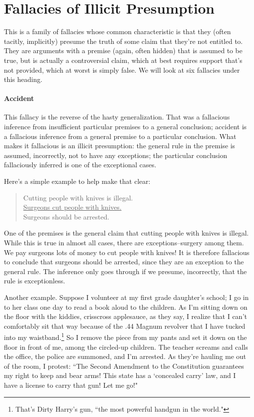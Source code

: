 \chapter{Fallacies of Illicit Presumption}
This is a family of fallacies whose common characteristic is that they (often tacitly, implicitly)
presume the truth of some claim that they're not entitled to. They are arguments with a premise
(again, often hidden) that is assumed to be true, but is actually a controversial claim, which at best
requires support that's not provided, which at worst is simply false. We will look at six fallacies
under this heading.

\subsubsection{Accident}
This fallacy is the reverse of the hasty generalization. That was a fallacious inference from
insufficient particular premises to a general conclusion; accident is a fallacious inference from a
general premise to a particular conclusion. What makes it fallacious is an illicit presumption: the
general rule in the premise is assumed, incorrectly, not to have any exceptions; the particular
conclusion fallaciously inferred is one of the exceptional cases.

Here's a simple example to help make that clear:

\begin{quote}Cutting people with knives is illegal. \\
\underline{Surgeons cut people with knives.} \\
Surgeons should be arrested. \end{quote}

One of the premises is the general claim that cutting people with knives is illegal. While this is
true in almost all cases, there are exceptions--surgery among them. We pay surgeons lots of
money to cut people with knives! It is therefore fallacious to conclude that surgeons should be
arrested, since they are an exception to the general rule. The inference only goes through if we
presume, incorrectly, that the rule is exceptionless.

Another example. Suppose I volunteer at my first grade daughter's school; I go in to her class one
day to read a book aloud to the children. As I'm sitting down on the floor with the kiddies, 
crisscross applesauce, as they say, I realize that I can't comfortably sit that way because of the .44
Magnum revolver that I have tucked into my waistband.\footnote{That's Dirty Harry's gun, ``the most powerful handgun in the world."} 
So I remove the piece from my pants
and set it down on the floor in front of me, among the circled-up children. The teacher screams
and calls the office, the police are summoned, and I'm arrested. As they're hauling me out of the
room, I protest: ``The Second Amendment to the Constitution guarantees my right to keep and bear
arms! This state has a `concealed carry' law, and I have a license to carry that gun! Let me go!"

